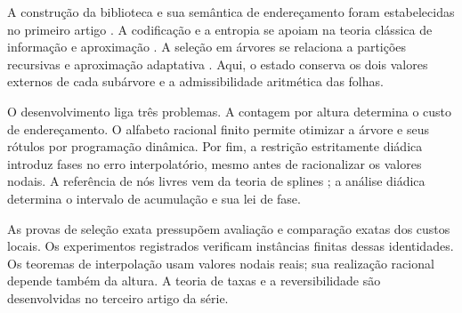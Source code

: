 \documentclass[11pt,a4paper]{article}
\theoremstyle{definition}
\theoremstyle{remark}
\begin{document}
A construção da biblioteca e sua semântica de endereçamento foram estabelecidas no primeiro artigo \citep{oliveiraI}. A codificação e a entropia se apoiam na teoria clássica de informação e aproximação \citep{kolmogorov1959,kolmogorov1961,elias1975,cohen2001,coverthomas2006}. A seleção em árvores se relaciona a partições recursivas e aproximação adaptativa \citep{breiman1984,donoho1997,blanchard2007,binev2004}. Aqui, o estado conserva os dois valores externos de cada subárvore e a admissibilidade aritmética das folhas.

O desenvolvimento liga três problemas. A contagem por altura determina o custo de endereçamento. O alfabeto racional finito permite otimizar a árvore e seus rótulos por programação dinâmica. Por fim, a restrição estritamente diádica introduz fases no erro interpolatório, mesmo antes de racionalizar os valores nodais. A referência de nós livres vem da teoria de splines \citep{deboor1973variable,burchard1974}; a análise diádica determina o intervalo de acumulação e sua lei de fase.

As provas de seleção exata pressupõem avaliação e comparação exatas dos custos locais. Os experimentos registrados verificam instâncias finitas dessas identidades. Os teoremas de interpolação usam valores nodais reais; sua realização racional depende também da altura. A teoria de taxas e a reversibilidade são desenvolvidas no terceiro artigo da série.
\end{document}

